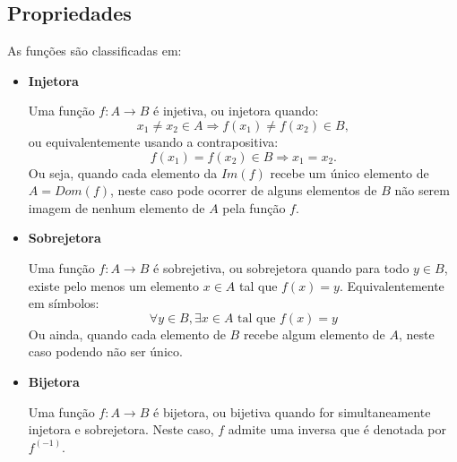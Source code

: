 \subsection{Propriedades}
As funções são classificadas em:

\begin{itemize}
 \item \textbf{Injetora}

 Uma função $f: A \rightarrow B$ é injetiva, ou injetora quando:
 \[ x_1 \neq x_2 \in A \Rightarrow f(x_1) \neq f(x_2) \in B ,\]
 ou equivalentemente usando a contrapositiva:
 \[f(x_1) = f(x_2) \in B \Rightarrow x_1 = x_2 .\]
 Ou seja, quando cada elemento da $Im(f)$ recebe um único elemento de $A= Dom(f)$, neste caso pode ocorrer de alguns elementos de $B$ não serem imagem de nenhum elemento de $A$ pela função $f$.

 \item \textbf{Sobrejetora}

 Uma função $f: A \rightarrow B$ é sobrejetiva, ou sobrejetora quando para todo $y \in B$, existe pelo menos um elemento $x \in A$ tal que $f(x) = y$. Equivalentemente em símbolos:
 $$\forall y \in B, \exists x \in A \text{ tal que } f(x) = y$$
 Ou ainda, quando cada elemento de $B$ recebe algum elemento de $A$, neste caso podendo não ser único.

 \item \textbf{Bijetora}

 Uma função $f: A \rightarrow B$ é bijetora, ou bijetiva quando for simultaneamente injetora e sobrejetora. Neste caso, $f$ admite uma inversa que é denotada por $f^{(-1)}$.

\end{itemize}


